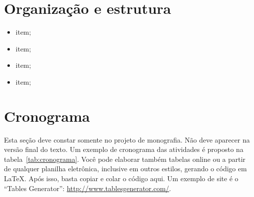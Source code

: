 \documentclass[
	12pt,				%
	openright,			%
	twoside,			%
	a4paper,			%
	english,			%
	brazil				%
	]{abntex2}
\begin{document}
\lipsum[7]

\lipsum[8]

\section{Organização e estrutura}

\lipsum*[9-11]

\begin{itemize}
	\item item;
	\item item;
	\item item;
	\item item;
\end{itemize}

\section{Cronograma}

Esta seção deve constar somente no projeto de monografia. Não deve aparecer na versão final do texto. Um exemplo de cronograma das atividades é proposto na tabela~\ref{tab:cronograma}. Você pode elaborar também tabelas online ou a partir de qualquer planilha eletrônica, inclusive em outros estilos, gerando o código em \LaTeX. Após isso, basta copiar e colar o código aqui. Um exemplo de site é o ``Tables Generator'': \url{http://www.tablesgenerator.com/}.
\end{document}
